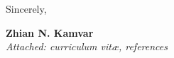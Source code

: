 \vspace{2ex}

Sincerely,

\vspace{5ex}

\textbf{Zhian N. Kamvar}\\
\textit{Attached: curriculum vit\ae{}, references}
\clearpage












